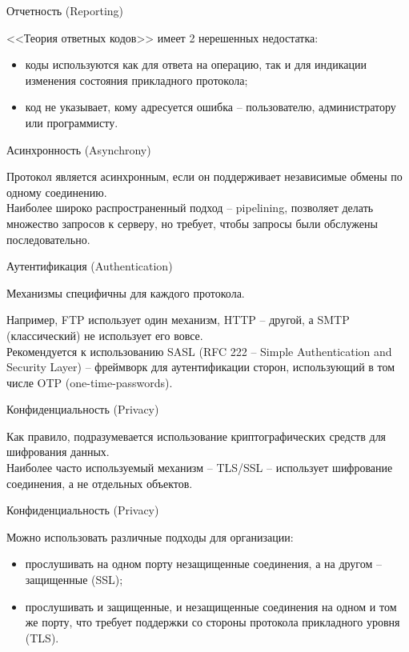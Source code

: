 \begin{frame}{Отчетность (Reporting)}

	<<Теория ответных кодов>> имеет 2 нерешенных недостатка:
	\begin{itemize}
		\item коды используются как для ответа на операцию,  так и для индикации изменения состояния прикладного протокола;
		\item код не указывает,  кому адресуется ошибка -- пользователю,  администратору или программисту.
	\end{itemize}
\end{frame}

\begin{frame}{Асинхронность (Asynchrony)}

	Протокол является асинхронным,  если он поддерживает независимые обмены по одному соединению. \\
	\bigskip
	Наиболее широко распространенный подход -- pipelining,  позволяет делать множество запросов к серверу,  но требует,  чтобы запросы были обслужены последовательно.
\end{frame}

\begin{frame}{Аутентификация (Authentication)}

	\large{Механизмы специфичны для каждого протокола.}

	Например,  FTP использует один механизм,  HTTP -- другой,  а SMTP (классический) не использует его вовсе.\\
	\bigskip
	Рекомендуется к использованию SASL {\color{gray} (RFC 222 -- Simple Authentication and Security Layer)} -- фреймворк для аутентификации сторон,  использующий в том числе OTP (one-time-passwords).
\end{frame}

\begin{frame}{Конфиденциальность (Privacy)}

	Как правило, подразумевается использование криптографических средств для шифрования данных.\\
	\bigskip
	Наиболее часто используемый механизм -- TLS/SSL -- использует шифрование соединения,  а не отдельных объектов.
\end{frame}

\begin{frame}{Конфиденциальность (Privacy)}

	Можно использовать различные подходы для организации:
	\begin{itemize}
		\item прослушивать на одном порту незащищенные соединения,  а на другом -- защищенные (SSL);
		\item прослушивать и защищенные,  и незащищенные соединения на одном и том же порту,  что требует поддержки со стороны протокола прикладного уровня (TLS).
	\end{itemize}
\end{frame}

